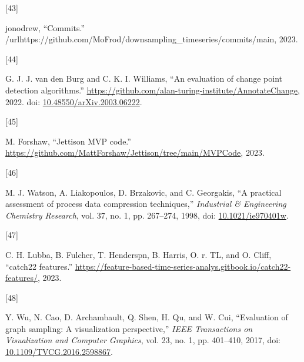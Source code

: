 \documentclass{article}
\newlength{\cslhangindent}
\newlength{\csllabelwidth}
\newlength{\cslentryspacingunit} %
\newenvironment{CSLReferences}[2] %
 {%
  \setlength{\parindent}{0pt}
  \ifodd #1
  \let\oldpar\par
  \def\par{\hangindent=\cslhangindent\oldpar}
  \fi
  \setlength{\parskip}{#2\cslentryspacingunit}
 }%
 {}
\newcommand{\CSLLeftMargin}[1]{\parbox[t]{\csllabelwidth}{#1}}
\newcommand{\CSLRightInline}[1]{\parbox[t]{\linewidth - \csllabelwidth}{#1}\break}
\begin{document}
\begin{CSLReferences}{0}{0}
\leavevmode{}%
\CSLLeftMargin{{[}43{]} }
\CSLRightInline{jonodrew, {``Commits.''}
/url{https://github.com/MoFrod/downsampling\_timeseries/commits/main},
2023.}

\leavevmode{}%
\CSLLeftMargin{{[}44{]} }
\CSLRightInline{G. J. J. van den Burg and C. K. I. Williams, {``An
evaluation of change point detection algorithms.''}
\url{https://github.com/alan-turing-institute/AnnotateChange}, 2022.
doi:
\href{https://doi.org/10.48550/arXiv.2003.06222}{10.48550/arXiv.2003.06222}.}

\leavevmode{}%
\CSLLeftMargin{{[}45{]} }
\CSLRightInline{M. Forshaw, {``Jettison MVP code.''}
\url{https://github.com/MattForshaw/Jettison/tree/main/MVPCode}, 2023.}

\leavevmode{}%
\CSLLeftMargin{{[}46{]} }
\CSLRightInline{M. J. Watson, A. Liakopoulos, D. Brzakovic, and C.
Georgakis, {``A practical assessment of process data compression
techniques,''} \emph{Industrial \& Engineering Chemistry Research}, vol.
37, no. 1, pp. 267--274, 1998, doi:
\href{https://doi.org/10.1021/ie970401w}{10.1021/ie970401w}.}

\leavevmode{}%
\CSLLeftMargin{{[}47{]} }
\CSLRightInline{C. H. Lubba, B. Fulcher, T. Henderspn, B. Harris, O. r.
TL, and O. Cliff, {``catch22 features.''}
\url{https://feature-based-time-series-analys.gitbook.io/catch22-features/},
2023.}

\leavevmode{}%
\CSLLeftMargin{{[}48{]} }
\CSLRightInline{Y. Wu, N. Cao, D. Archambault, Q. Shen, H. Qu, and W.
Cui, {``Evaluation of graph sampling: A visualization perspective,''}
\emph{IEEE Transactions on Visualization and Computer Graphics}, vol.
23, no. 1, pp. 401--410, 2017, doi:
\href{https://doi.org/10.1109/TVCG.2016.2598867}{10.1109/TVCG.2016.2598867}.}

\end{CSLReferences}



\end{document}
